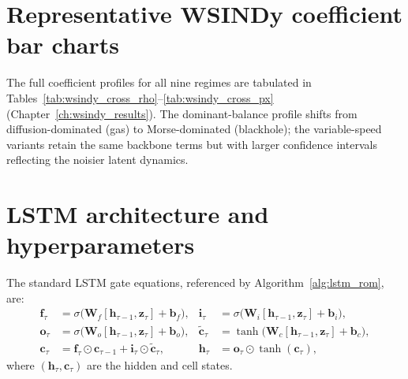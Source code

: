 \section{Representative WSINDy coefficient bar charts}

The full coefficient profiles for all nine regimes are tabulated in
Tables~\ref{tab:wsindy_cross_rho}--\ref{tab:wsindy_cross_px}
(Chapter~\ref{ch:wsindy_results}).  The dominant-balance profile shifts
from diffusion-dominated (gas) to Morse-dominated (blackhole); the
variable-speed variants retain the same backbone terms but with larger
confidence intervals reflecting the noisier latent dynamics.

\section{LSTM architecture and hyperparameters}
\label{sec:appG_lstm}

The standard LSTM gate equations, referenced by Algorithm~\ref{alg:lstm_rom}, are:
\begin{align}
\mathbf{f}_\tau &= \sigma\!\bigl(\mathbf{W}_f[\mathbf{h}_{\tau-1},\mathbf{z}_\tau]+\mathbf{b}_f\bigr), &
\mathbf{i}_\tau &= \sigma\!\bigl(\mathbf{W}_i[\mathbf{h}_{\tau-1},\mathbf{z}_\tau]+\mathbf{b}_i\bigr), \nonumber\\
\mathbf{o}_\tau &= \sigma\!\bigl(\mathbf{W}_o[\mathbf{h}_{\tau-1},\mathbf{z}_\tau]+\mathbf{b}_o\bigr), &
\tilde{\mathbf{c}}_\tau &= \tanh\!\bigl(\mathbf{W}_c[\mathbf{h}_{\tau-1},\mathbf{z}_\tau]+\mathbf{b}_c\bigr), \nonumber\\
\mathbf{c}_\tau &= \mathbf{f}_\tau \odot \mathbf{c}_{\tau-1} + \mathbf{i}_\tau \odot \tilde{\mathbf{c}}_\tau, &
\mathbf{h}_\tau &= \mathbf{o}_\tau \odot \tanh(\mathbf{c}_\tau),
\label{eq:lstm_gates}
\end{align}
where $(\mathbf{h}_\tau,\mathbf{c}_\tau)$ are the hidden and cell states.

